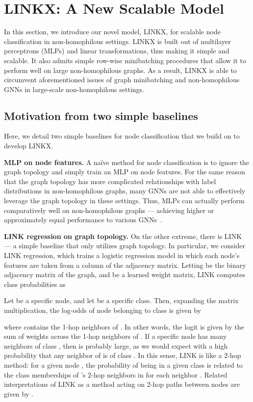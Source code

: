 \documentclass{article}
\newcommand{\myparagraph}[1]{\noindent \textbf{#1}}
\begin{document}
\section{LINKX: A New Scalable Model}\label{sec:linkx}



In this section, we introduce our novel model, LINKX, for scalable node classification in non-homophilous settings. LINKX is built out of multilayer perceptrons (MLPs) and linear transformations, thus making it simple and scalable. It also admits simple row-wise minibatching procedures that allow it to perform well on large non-homophilous graphs. 
As a result, LINKX is able to circumvent aforementioned issues of graph minibatching and non-homophilous GNNs in large-scale non-homophilous settings.

\subsection{Motivation from two simple baselines}

Here, we detail two simple baselines for node classification that we build on to develop LINKX. 

\myparagraph{MLP on node features.} A na\"ive method for node classification is to ignore the graph topology and simply train an MLP on node features. 
For the same reason that the graph topology has more complicated relationships with label distributions in non-homophilous graphs, many GNNs are not able to effectively leverage the graph topology in these settings. Thus, MLPs can actually perform comparatively well on non-homophilous graphs --- achieving higher or approximately equal performance to various GNNs~\cite{zhu2020beyond}.


\myparagraph{LINK regression on graph topology.} On the other extreme, there is LINK~\cite{zheleva2009to} --- a simple baseline that only utilizes graph topology. In particular, we consider LINK regression, which trains a logistic regression model in which each node's features are taken from a column of the adjacency matrix. Letting  be the binary adjacency matrix of the graph, and  be a learned weight matrix, LINK computes class probabilities as

Let  be a specific node, and let  be a specific class. Then, expanding the matrix multiplication, the log-odds of node  belonging to class  is given by

where  contains the 1-hop neighbors of . In other words, the logit is given by the sum of weights  across the 1-hop neighbors of . If a specific node  has many neighbors of class , then  is probably large, as we would expect with a high probability that any neighbor of  is of class . 
In this sense, LINK is like a 2-hop method: for a given node , the probability of being in a given class is related to the class memberships of 's 2-hop neighbors in  for each neighbor . Related interpretations of LINK as a method acting on 2-hop paths between nodes are given by \citet{altenburger2018monophily}.
\end{document}
